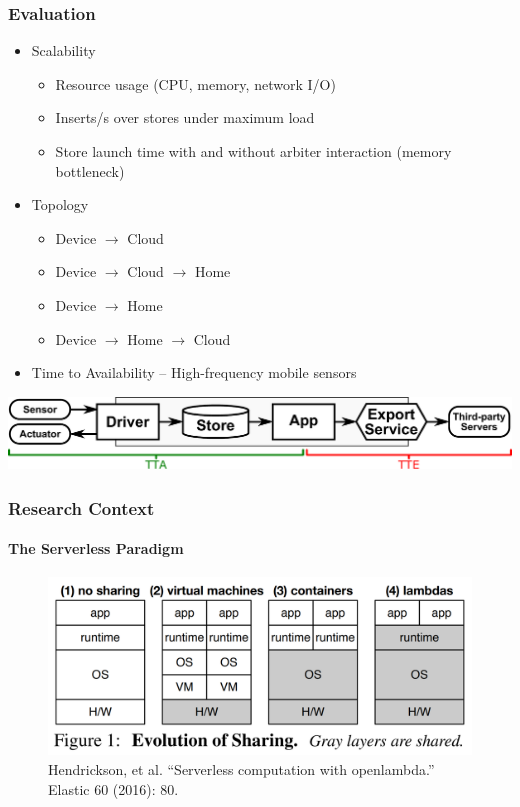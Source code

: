 \documentclass[aspectratio=169]{beamer}
\begin{document}
\begin{frame}
	\frametitle{Evaluation}
	\begin{itemize}
		\item Scalability
		\begin{itemize}
			\item Resource usage (CPU, memory, network I/O)
			\item Inserts/s over stores under maximum load
			\item Store launch time with and without arbiter interaction (memory bottleneck)
		\end{itemize}
		\item Topology
		\begin{itemize}
			\item Device $\rightarrow$ Cloud
			\item Device $\rightarrow$ Cloud $\rightarrow$ Home
			\item Device $\rightarrow$ Home
			\item Device $\rightarrow$ Home $\rightarrow$ Cloud
		\end{itemize}
		\item Time to Availability -- High-frequency mobile sensors
	\end{itemize}
	\centering
	\includegraphics[width=0.8\linewidth]{tta-tte.pdf}
\end{frame}

\begin{frame}
	\frametitle{Research Context}
	\framesubtitle{The Serverless Paradigm}

	\begin{figure}
		\centering
		\includegraphics[width=\linewidth]{openlambda}
		\caption{Hendrickson, et al. ``Serverless computation with openlambda.'' Elastic 60 (2016): 80.}
	\end{figure}
\end{frame}
\end{document}

